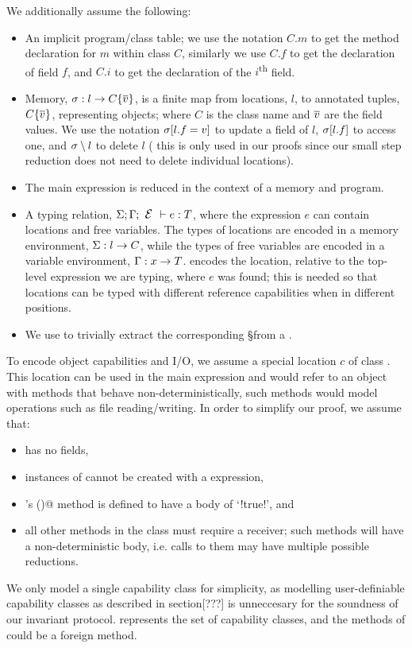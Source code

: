 We additionally assume the following:
\begin{itemize}
	\item An implicit program/class table; we use the notation $C.m$ to get the method declaration for $m$ within class $C$, similarly we use $C.f$ to get the declaration of field $f$, and $C.i$ to get the declaration of the $i$\textsuperscript{th} field.
	\item Memory, $\s : l\rightarrow C\{\Many{v}\}${, is} a finite map from locations, $l$, to annotated tuples, $C\{\Many{v}\}$, representing objects; where $C$ is the class name and $\Many{v}$ are the field values.
	We use the notation $\s[l.f=v]$ to update a field of $l$, $\s[l.f]$ to access one, and $\s \setminus l$ to delete $l$ (
this is only used in our proofs since our small step reduction does not need to delete individual locations).
	\item The main expression is reduced in the context of a memory and program.
	\item A typing relation, $\S;\G;\E\vdash e:T$, where 
	the expression $e$ can contain locations and free variables. The types of locations are encoded in 
a memory environment, 
$\S : l\rightarrow C$,
	while the types of free variables are encoded in
a variable environment, $\G : x\rightarrow T$. \E encodes the location, relative to the top-level expression we are typing, where $e$ was found; this is needed so that locations can be typed with different reference capabilities when in different positions.
	\item We use \Ss to trivially extract the corresponding \S from a \s.
\end{itemize}

\noindent To encode object capabilities and I/O, we assume a special location  $c$ of class \Q@Cap@. This location can be used in the main expression and would refer to an object with methods that behave non-deterministically, such methods would model operations such as file reading/writing. In order to simplify our proof, we assume that:
\begin{itemize}
	\item \Q@Cap@ has no fields,
	\item instances of \Q@Cap@ cannot be created with a \Q@new@ expression,
	\item \Q@Cap@'s \Q@invariant()@ method is defined to have a body of `\Q!true!', and
	\item all other methods in the \Q@Cap@ class must require a \Q@mut@ receiver; such methods will have a non-deterministic body, i.e. calls to them may have multiple possible reductions.
\end{itemize}
We only model a single \Q@Cap@ capability class for simplicity, as modelling user-definiable capability classes as described in section[???] is unneccesary for the soundness of our invariant protocol.
\Q@Cap@ represents the set of capability classes, and the \Q@mut@ methods of \Q@Cap@ could be a foreign method.


